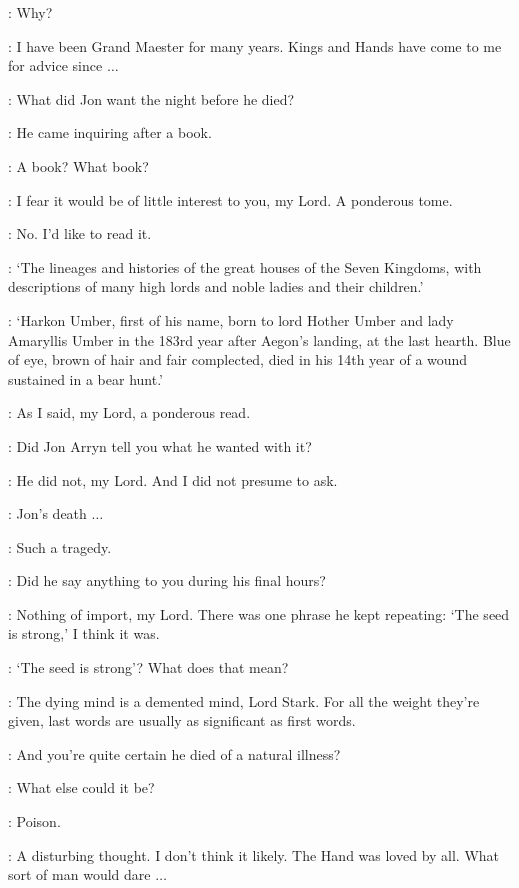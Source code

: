 \NED: Why? 

\PYCELLE: I have been Grand Maester for many years. Kings and Hands have come to me for advice since $\ldots$ 

\NED: What did Jon want the night before he died? 

\PYCELLE: He came inquiring after a book. 

\NED: A book? What book? 

\PYCELLE: I fear it would be of little interest to you, my Lord. A ponderous tome. 

\NED: No. I'd like to read it. 


\PYCELLE: `The lineages and histories of the great houses of the Seven Kingdoms, with descriptions of many high lords and noble ladies and their children.'

\NED: `Harkon Umber, first of his name, born to lord Hother Umber and lady Amaryllis Umber in the 183rd year after Aegon's landing, at the last hearth. Blue of eye, brown of hair and fair complected, died in his 14th year of a wound sustained in a bear hunt.'

\PYCELLE: As I said, my Lord, a ponderous read. 

\NED: Did Jon Arryn tell you what he wanted with it? 

\PYCELLE: He did not, my Lord. And I did not presume to ask. 

\NED: Jon's death $\ldots$ 

\PYCELLE: Such a tragedy. 

\NED: Did he say anything to you during his final hours? 

\PYCELLE: Nothing of import, my Lord. There was one phrase he kept repeating: `The seed is strong,' I think it was. 

\NED: `The seed is strong'? What does that mean? 

\PYCELLE: The dying mind is a demented mind, Lord Stark. For all the weight they're given, last words are usually as significant as first words. 

\NED: And you're quite certain he died of a natural illness? 

\PYCELLE: What else could it be? 

\NED: Poison. 

\PYCELLE: A disturbing thought. I don't think it likely. The Hand was loved by all. What sort of man would dare $\ldots$ 

